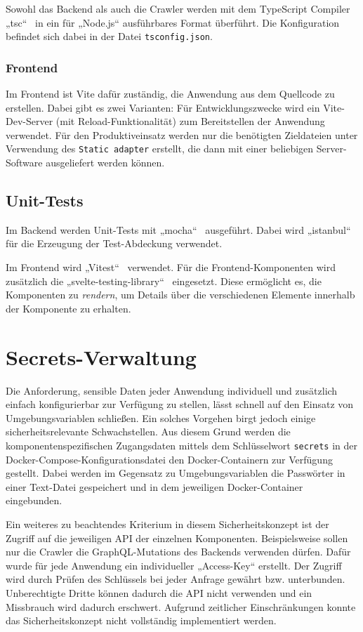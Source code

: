 \documentclass[a4paper, 10pt, conference]{IEEEtran}
\begin{document}
Sowohl das Backend als auch die Crawler werden mit dem TypeScript Compiler „tsc“~\cite{typescript} in ein für „Node.js“ ausführbares Format überführt. Die Konfiguration befindet sich dabei in der Datei \texttt{tsconfig.json}.

\subsubsection{Frontend}
Im Frontend ist Vite dafür zuständig, die Anwendung aus dem Quellcode zu erstellen. Dabei gibt es zwei Varianten: Für Entwicklungszwecke wird ein Vite-Dev-Server (mit Reload-Funktionalität) zum Bereitstellen der Anwendung verwendet. Für den Produktiveinsatz werden nur die benötigten Zieldateien unter Verwendung des \texttt{Static adapter} erstellt, die dann mit einer beliebigen Server-Software ausgeliefert werden können.

\subsection{Unit-Tests}

Im Backend werden Unit-Tests mit „mocha“~\cite{mochajs} ausgeführt. Dabei wird „istanbul“ \cite{istanbuljs} für die Erzeugung der Test-Abdeckung verwendet.

Im Frontend wird „Vitest“~\cite{vitest} verwendet. Für die Frontend-Komponenten wird zusätzlich die „svelte-testing-library“~ \cite{stl} eingesetzt. Diese ermöglicht es, die Komponenten zu \textit{rendern}, um Details über die verschiedenen Elemente innerhalb der Komponente zu erhalten.

\section{Secrets-Verwaltung} \label{s:secrets}

Die Anforderung, sensible Daten jeder Anwendung individuell und zusätzlich einfach konfigurierbar zur Verfügung zu stellen, lässt schnell auf den Einsatz von Umgebungsvariablen schließen. Ein solches Vorgehen birgt jedoch einige sicherheitsrelevante Schwachstellen. Aus diesem Grund werden die komponentenspezifischen Zugangsdaten mittels dem Schlüsselwort \texttt{secrets} in der Docker-Compose-Konfigurationsdatei den Docker-Containern zur Verfügung gestellt. Dabei werden im Gegensatz zu Umgebungsvariablen die Passwörter in einer Text-Datei gespeichert und in dem jeweiligen Docker-Container eingebunden.

Ein weiteres zu beachtendes Kriterium in diesem Sicherheitskonzept ist der Zugriff auf die jeweiligen API der einzelnen Komponenten. Beispielsweise sollen nur die Crawler die GraphQL-Mutations des Backends verwenden dürfen. Dafür wurde für jede Anwendung ein individueller „Access-Key“ erstellt. Der Zugriff wird durch Prüfen des Schlüssels bei jeder Anfrage gewährt bzw. unterbunden. Unberechtigte Dritte können dadurch die API nicht verwenden und ein Missbrauch wird dadurch erschwert. Aufgrund zeitlicher Einschränkungen konnte das Sicherheitskonzept nicht vollständig implementiert werden.
\end{document}
